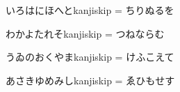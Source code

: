 \documentclass[a4paper]{ltjsarticle}
\begin{document}
いろはにほへとkanjiskip = \the\kanjiskip ちりぬるを\par
\setlength{\kanjiskip}{0.5zw plus 0.1zw}
わかよたれそkanjiskip = \the\kanjiskip つねならむ\par
\noautospacing
うゐのおくやまkanjiskip = \the\kanjiskip けふこえて\par
\autospacing
あさきゆめみしkanjiskip = \the\kanjiskip ゑひもせす\par
\end{document}
